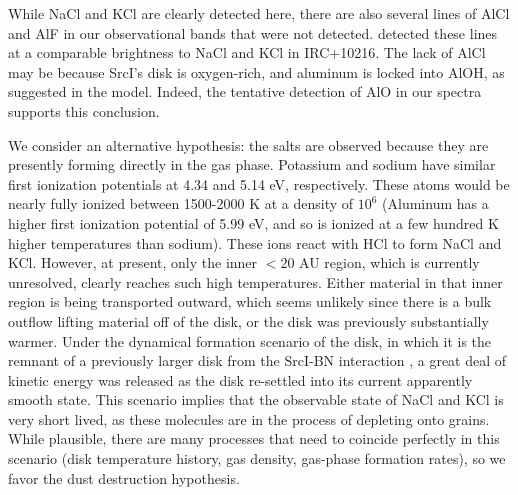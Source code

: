 \documentclass[twocolumn]{aastex62}
\newcommand{\sourcei}{SrcI\xspace}
\begin{document}
While NaCl and KCl are clearly detected here, there are also several lines of
AlCl and AlF in our observational bands that were not detected.
\citet{Cernicharo1987a} detected these lines at a comparable brightness to NaCl
and KCl in IRC+10216.  The lack of AlCl may be because \sourcei's disk is
oxygen-rich, and aluminum is locked into AlOH, as suggested in the
\citet{Cherncheff2012a} model.  Indeed, the tentative detection of AlO
in our spectra supports this conclusion.


We consider an alternative hypothesis: the salts are observed because they are
presently forming directly in the gas phase.  Potassium and sodium have similar
first ionization potentials at 4.34 and 5.14 eV, respectively.  These atoms
would be nearly fully ionized between 1500-2000 K at a density of $10^6$
\percc (Aluminum has a higher first ionization potential of 5.99 eV, and so is ionized
at a few hundred K higher temperatures than sodium).  These ions react with HCl
to form NaCl and KCl.  However, at present, only the inner $<20$ AU region,
which is currently unresolved, clearly reaches
such high temperatures.  Either material in that inner region is being
transported outward, which seems unlikely since there is a bulk outflow lifting
material off of the disk, or the disk was previously substantially warmer.
Under the dynamical formation scenario of the disk, in which it is the remnant
of a previously larger disk from the \sourcei-BN interaction
\citep{Bally2017a,Luhman2018a}, a great deal of kinetic energy was released as
the disk re-settled into its current apparently smooth state.  This scenario
implies that the observable state of NaCl and KCl is very short lived, as these
molecules are in the process of depleting onto grains.
While plausible, there are many processes that need to coincide perfectly
in this scenario (disk temperature history, gas density, gas-phase formation
rates), so we favor the dust destruction hypothesis.


\end{document}
